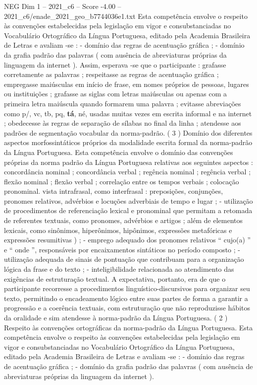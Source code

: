 \begin{textsample}{NEG Dim 1 – 2021\_c6 – Score -4.00 – 2021\_c6/enade\_2021\_geo\_b7744036e1.txt}
Esta competência envolve o respeito às convenções estabelecidas pela legislação em vigor e consubstanciadas no Vocabulário Ortográfico da Língua Portuguesa, editado pela Academia Brasileira de Letras e avaliam -se : - domínio das regras de acentuação gráfica ; - domínio da grafia padrão das palavras ( com ausência de abreviaturas próprias da linguagem da internet ).
Assim, esperava -se que o participante : grafasse corretamente as palavras ; respeitasse as regras de acentuação gráfica ; empregasse maiúsculas em início de frase, em nomes próprios de pessoas, lugares ou instituições ; grafasse as siglas com letras maiúsculas ou apenas com a primeira letra maiúscula quando formarem uma palavra ; evitasse abreviações como p/, vc, tb, pq, \textbf{tá}, né, usadas muitas vezes em escrita informal e na internet ; obedecesse às regras de separação de sílabas no final da linha ; atendesse aos padrões de segmentação vocabular da norma-padrão. ( 3 ) Domínio dos diferentes aspectos morfossintáticos próprios da modalidade escrita formal da norma-padrão da Língua Portuguesa.
Esta competência envolve o domínio das convenções próprias da norma padrão da Língua Portuguesa relativas aos seguintes aspectos : concordância nominal ; concordância verbal ; regência nominal ; regência verbal ; flexão nominal ; flexão verbal ; correlação entre os tempos verbais ; colocação pronominal. vista intrafrasal, como interfrasal : preposições, conjunções, pronomes relativos, advérbios e locuções adverbiais de tempo e lugar ; - utilização de procedimentos de referenciação lexical e pronominal que permitam a retomada de referentes textuais, como pronomes, advérbios e artigos ; além de elementos lexicais, como sinônimos, hiperônimos, hipônimos, expressões metafóricas e expressões resumitivas ) ; - emprego adequado dos pronomes relativos “ cujo(a) ” e “ onde ”, responsáveis por encaixamentos sintáticos no período composto ; - utilização adequada de sinais de pontuação que contribuam para a organização lógica da frase e do texto ; - inteligibilidade relacionada ao atendimento das exigências de estruturação textual.
A expectativa, portanto, era de que o participante recorresse a procedimentos linguístico-discursivos para organizar seu texto, permitindo o encadeamento lógico entre suas partes de forma a garantir a progressão e a coerência textuais, com estruturação que não reproduzisse hábitos da oralidade e sim atendesse à norma-padrão da Língua Portuguesa. ( 2 ) Respeito às convenções ortográficas da norma-padrão da Língua Portuguesa.
Esta competência envolve o respeito às convenções estabelecidas pela legislação em vigor e consubstanciadas no Vocabulário Ortográfico da Língua Portuguesa, editado pela Academia Brasileira de Letras e avaliam -se : - domínio das regras de acentuação gráfica ; - domínio da grafia padrão das palavras ( com ausência de abreviaturas próprias da linguagem da internet ).

\end{textsample}
